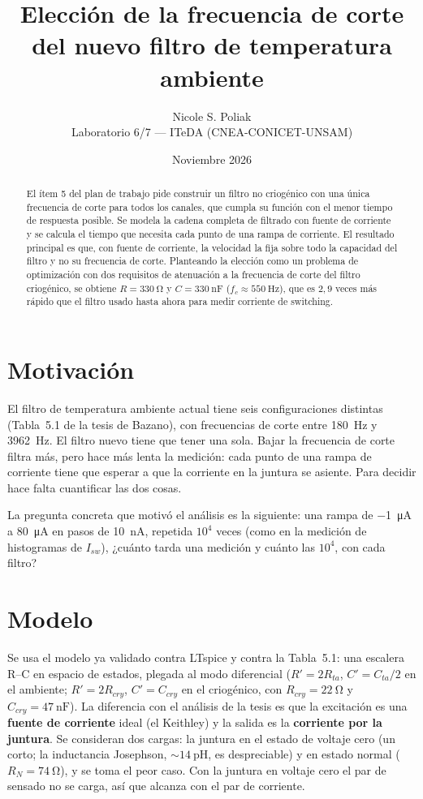 \documentclass[11pt,a4paper]{article}
\title{Elección de la frecuencia de corte\\del nuevo filtro de temperatura ambiente}
\author{Nicole S. Poliak \\ \small Laboratorio 6/7 --- ITeDA (CNEA-CONICET-UNSAM)}
\date{Noviembre 2026}
\begin{document}
\maketitle

\begin{abstract}
El ítem 5 del plan de trabajo pide construir un filtro no criogénico con una única frecuencia de
corte para todos los canales, que cumpla su función con el menor tiempo de respuesta posible. Se
modela la cadena completa de filtrado con fuente de corriente y se calcula el tiempo que necesita
cada punto de una rampa de corriente. El resultado principal es que, con fuente de corriente, la
velocidad la fija sobre todo la capacidad del filtro y no su frecuencia de corte. Planteando la
elección como un problema de optimización con dos requisitos de atenuación a la frecuencia de
corte del filtro criogénico, se obtiene $R = \SI{330}{\ohm}$ y $C = \SI{330}{\nano\farad}$
($f_c \approx \SI{550}{\hertz}$), que es $2{,}9$ veces más rápido que el filtro usado hasta ahora
para medir corriente de switching.
\end{abstract}

\section{Motivación}

El filtro de temperatura ambiente actual tiene seis configuraciones distintas
(Tabla~5.1 de la tesis de Bazano), con frecuencias de corte entre \SI{180}{\hertz} y
\SI{3962}{\hertz}. El filtro nuevo tiene que tener una sola. Bajar la frecuencia de corte filtra
más, pero hace más lenta la medición: cada punto de una rampa de corriente tiene que esperar a
que la corriente en la juntura se asiente. Para decidir hace falta cuantificar las dos cosas.

La pregunta concreta que motivó el análisis es la siguiente: una rampa de \SI{-1}{\micro\ampere}
a \SI{80}{\micro\ampere} en pasos de \SI{10}{\nano\ampere}, repetida $10^4$ veces (como en la
medición de histogramas de $I_{sw}$), ¿cuánto tarda una medición y cuánto las $10^4$, con cada filtro?

\section{Modelo}

Se usa el modelo ya validado contra LTspice y contra la Tabla~5.1: una escalera R--C en espacio
de estados, plegada al modo diferencial ($R' = 2R_{ta}$, $C' = C_{ta}/2$ en el ambiente;
$R' = 2R_{cry}$, $C' = C_{cry}$ en el criogénico, con $R_{cry} = \SI{22}{\ohm}$ y
$C_{cry} = \SI{47}{\nano\farad}$). La diferencia con el análisis de la tesis es que la excitación
es una \textbf{fuente de corriente} ideal (el Keithley) y la salida es la \textbf{corriente por
la juntura}. Se consideran dos cargas: la juntura en el estado de voltaje cero (un corto; la
inductancia Josephson, $\sim\SI{14}{\pico\henry}$, es despreciable) y en estado normal
($R_N = \SI{74}{\ohm}$), y se toma el peor caso. Con la juntura en voltaje cero el par de
sensado no se carga, así que alcanza con el par de corriente.
\end{document}
